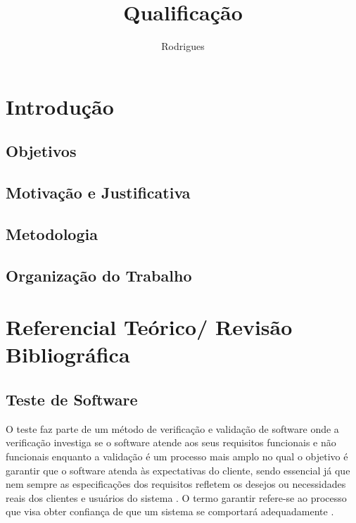 \documentclass[dm,ppgcomp]{texfurg} %
\title{Qualificação}
\author{Rodrigues}{Bruno Coelho}
\begin{document}

\maketitle

\sloppy

\tableofcontents

\chapter{Introdução}
  

\section{Objetivos}


 
\section{Motivação e Justificativa}


\section{Metodologia}



\section{Organização do Trabalho}



\chapter{Referencial Teórico/ Revisão Bibliográfica}

\section{Teste de Software}

O teste faz parte de um método de verificação e validação de software onde a verificação investiga se o software atende aos seus requisitos funcionais e não funcionais enquanto a validação é um processo mais amplo no qual o objetivo é garantir que o software atenda às expectativas do cliente, sendo essencial já que nem sempre as especificações dos requisitos refletem os desejos ou necessidades reais dos clientes e usuários do sistema \cite{sommerville2010}. O termo garantir refere-se ao processo que visa obter confiança de que um sistema se comportará adequadamente \cite{winikoff2010assurance}. 
\end{document}
